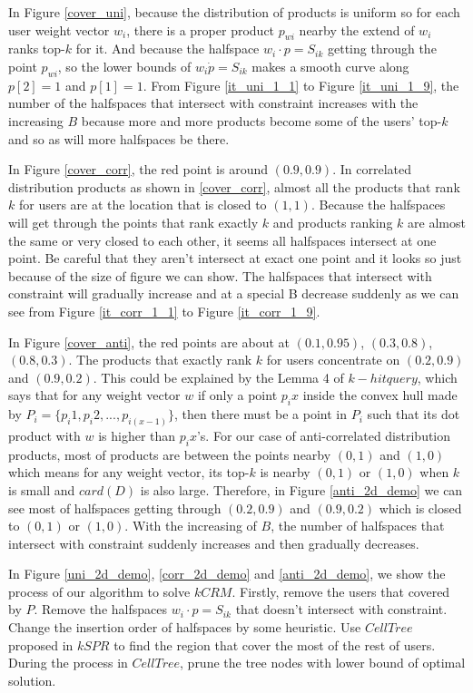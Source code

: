 In Figure \ref{cover_uni}, because the distribution of products is uniform so 
for each user weight vector $w_i$, there is a proper product $p_{wi}$ nearby the extend of
$w_i$ ranks top-$k$ for it. And because the halfspace $w_i\cdot p=S_{ik}$ getting through the point $p_{wi}$,
so the lower bounds of $w_i\dot p=S_{ik}$ makes a smooth curve along $p[2]=1$ and
$p[1]=1$. From Figure \ref{it_uni_1_1} to Figure \ref{it_uni_1_9}, the number of the halfspaces
that intersect with constraint increases with the increasing $B$ because more and more 
products become some of the users' top-$k$ and so as will more halfspaces be there.


In Figure \ref{cover_corr}, the red point is around $(0.9, 0.9)$. In correlated 
distribution products as shown in \ref{cover_corr}, almost all the products that 
rank $k$ for users are at the location that is closed to $(1, 1)$. Because the 
halfspaces will get through the points that rank exactly $k$ and
products ranking $k$ are almost the same or very closed to each other, it seems all
halfspaces intersect at one point. Be careful that they aren't intersect at exact
one point and it looks so just because of the size of figure we can show. The halfspaces
that intersect with constraint will gradually increase and at a special B decrease
suddenly as we can see from Figure \ref{it_corr_1_1} to Figure \ref{it_corr_1_9}.

In Figure \ref{cover_anti}, the red points are about at $(0.1, 0.95)$, $(0.3, 0.8)$, $(0.8, 0.3)$.
The products that exactly rank $k$ for users concentrate on $(0.2, 0.9)$ and $(0.9, 0.2)$.
This could be explained by the Lemma 4 of $k-hit query$, which says that for any 
weight vector $w$ if only a point $p_ix$ inside the convex hull made by 
$P_i=\{p_i1, p_i2, ..., p_{i(x-1)}\}$, then there must be a point in $P_i$
such that its dot product with $w$ is higher than $p_ix$'s. 
For our case of anti-correlated distribution products, most of products are between
the points nearby $(0, 1)$ and $(1, 0)$ which means for any weight vector, its top-$k$
is nearby $(0, 1)$ or $(1,0)$ when $k$ is small and $card(D)$ is also large. Therefore,
in Figure \ref{anti_2d_demo} we can see most of halfspaces getting through $(0.2, 0.9)$ and $(0.9, 0.2)$
which is closed to $(0,1)$ or $(1, 0)$. With the increasing of $B$, the number of 
halfspaces that 
intersect with constraint suddenly increases and then gradually decreases. 


In Figure \ref{uni_2d_demo}, \ref{corr_2d_demo} and \ref{anti_2d_demo}, we show the process of our
algorithm to solve $kCRM$. Firstly, remove the users that covered by $P$. Remove the 
halfspaces $w_i\cdot p=S_{ik}$ that doesn't intersect with constraint. Change
the insertion order of halfspaces by some heuristic. Use $CellTree$
proposed in $kSPR$ to find the region that cover the most of the rest of users.
During the process in $CellTree$, prune the tree nodes with lower bound of optimal
solution.



